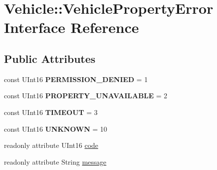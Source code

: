 \hypertarget{interfaceVehicle_1_1VehiclePropertyError}{\section{Vehicle\-:\-:Vehicle\-Property\-Error Interface Reference}
\label{interfaceVehicle_1_1VehiclePropertyError}
}
\subsection*{Public Attributes}
\begin{DoxyCompactItemize}
\item 
\hypertarget{interfaceVehicle_1_1VehiclePropertyError_a27b1c8eaa19b4be26525a9dd6e3d27a5}{const U\-Int16 {\bfseries P\-E\-R\-M\-I\-S\-S\-I\-O\-N\-\_\-\-D\-E\-N\-I\-E\-D} = 1}\label{interfaceVehicle_1_1VehiclePropertyError_a27b1c8eaa19b4be26525a9dd6e3d27a5}

\item 
\hypertarget{interfaceVehicle_1_1VehiclePropertyError_adae480e80e2befe1fc09ba582d76ac71}{const U\-Int16 {\bfseries P\-R\-O\-P\-E\-R\-T\-Y\-\_\-\-U\-N\-A\-V\-A\-I\-L\-A\-B\-L\-E} = 2}\label{interfaceVehicle_1_1VehiclePropertyError_adae480e80e2befe1fc09ba582d76ac71}

\item 
\hypertarget{interfaceVehicle_1_1VehiclePropertyError_a7f49a792cc45ee0c667ea8758056c80f}{const U\-Int16 {\bfseries T\-I\-M\-E\-O\-U\-T} = 3}\label{interfaceVehicle_1_1VehiclePropertyError_a7f49a792cc45ee0c667ea8758056c80f}

\item 
\hypertarget{interfaceVehicle_1_1VehiclePropertyError_add1b76116bac67818e9d1afeb1e6ad13}{const U\-Int16 {\bfseries U\-N\-K\-N\-O\-W\-N} = 10}\label{interfaceVehicle_1_1VehiclePropertyError_add1b76116bac67818e9d1afeb1e6ad13}

\item 
readonly attribute U\-Int16 \hyperlink{interfaceVehicle_1_1VehiclePropertyError_a407fb4d4577a87e75a5436e8e712d972}{code}
\item 
readonly attribute String \hyperlink{interfaceVehicle_1_1VehiclePropertyError_a67b42d05a341b9bf448776b71b958e7b}{message}
\end{DoxyCompactItemize}


